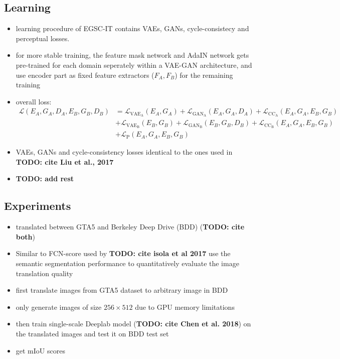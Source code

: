 \documentclass[]{article}
\newcommand{\todo}[1]{{\color{red}\bf{TODO: #1}}}
\begin{document}
\subsection{Learning}
\begin{itemize}
	\item learning procedure of EGSC-IT contains VAEs, GANs, cycle-consistecy and perceptual losses.
	\item for more stable training, the feature mask network and AdaIN network gets pre-trained for each domain seperately within a VAE-GAN architecture, and use encoder part as fixed feature extractors ($F_A, F_B$) for the remaining training
	\item overall loss: 
	\begin{align}
		\mathcal{L}(E_A, G_A, D_A, E_B, G_B, D_B) &= \mathcal{L}_{\text{VAE}_\text{A}}(E_A, G_A) + \mathcal{L}_{\text{GAN}_{\text{A}}}(E_A,G_A,D_A) + \mathcal{L}_{\text{CC}_{\text{A}}}(E_A, G_A, E_B, G_B)\\
		&+  \mathcal{L}_{\text{VAE}_\text{B}}(E_B, G_B) + \mathcal{L}_{\text{GAN}_{\text{B}}}(E_B,G_B,D_B) + \mathcal{L}_{\text{CC}_{\text{B}}}(E_A, G_A, E_B, G_B)\\
		&+ \mathcal{L}_{\text{P}}(E_A, G_A, E_B, G_B)
	\end{align}
	\item VAEs, GANs and cycle-consistency losses identical to the ones used in \todo{cite Liu et al., 2017}
	\item \todo{add rest}
\end{itemize}

\subsection{Experiments}
\begin{itemize}
	\item translated between GTA5 and Berkeley Deep Drive (BDD) (\todo{cite both})
	\item Similar to FCN-score used by \todo{cite isola et al 2017} use the semantic segmentation performance to quantitatively evaluate the image translation quality
	\item first translate images from GTA5 dataset to arbitrary image in BDD
	\item only generate images of size $256 \times 512$ due to GPU memory limitations
	\item then train single-scale Deeplab model (\todo{cite Chen et al. 2018}) on the translated images and test it on BDD test set
	\item get mIoU scores
\end{itemize}
\end{document}
